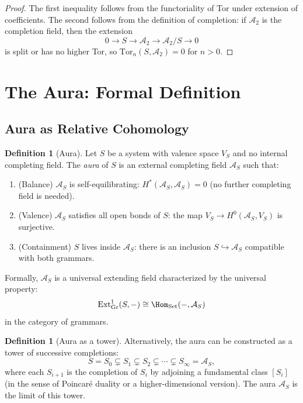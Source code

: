 \documentclass[12pt]{article}
\theoremstyle{definition}
\newtheorem{definition}[theorem]{Definition}
\theoremstyle{remark}
\newcommand{\Ext}{\mathrm{Ext}}
\newcommand{\Tor}{\mathrm{Tor}}
\begin{document}
\begin{proof}
The first inequality follows from the functoriality of Tor under extension of coefficients. The second follows from the definition of completion: if $\mathcal{A}_2$ is the completion field, then the extension
\[
0 \to S \to \mathcal{A}_2 \to \mathcal{A}_2/S \to 0
\]
is split or has no higher Tor, so $\Tor_n(S, \mathcal{A}_2) = 0$ for $n > 0$.
\end{proof}

\section{The Aura: Formal Definition}

\subsection{Aura as Relative Cohomology}

\begin{definition}[Aura]
Let $S$ be a system with valence space $V_S$ and no internal completing field. The \emph{aura} of $S$ is an external completing field $\mathcal{A}_S$ such that:
\begin{enumerate}
\item (Balance) $\mathcal{A}_S$ is self-equilibrating: $H^*(\mathcal{A}_S, \mathcal{A}_S) = 0$ (no further completing field is needed).
\item (Valence) $\mathcal{A}_S$ satisfies all open bonds of $S$: the map $V_S \to H^0(\mathcal{A}_S, V_S)$ is surjective.
\item (Containment) $S$ lives inside $\mathcal{A}_S$: there is an inclusion $S \hookrightarrow \mathcal{A}_S$ compatible with both grammars.
\end{enumerate}
Formally, $\mathcal{A}_S$ is a universal extending field characterized by the universal property:
\[
\Ext^1_{\mathrm{Gr}}(S, -) \cong \Hom_{\mathrm{Set}}(-, \mathcal{A}_S)
\]
in the category of grammars.
\end{definition}

\begin{definition}[Aura as a tower]
Alternatively, the aura can be constructed as a tower of successive completions:
\[
S = S_0 \subsetneq S_1 \subsetneq S_2 \subsetneq \cdots \subsetneq S_\infty = \mathcal{A}_S,
\]
where each $S_{i+1}$ is the completion of $S_i$ by adjoining a fundamental class $[S_i]$ (in the sense of Poincar\'e duality or a higher-dimensional version).
The aura $\mathcal{A}_S$ is the limit of this tower.
\end{definition}
\end{document}
